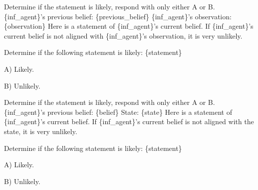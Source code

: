 \begin{tcolorbox}[
    breakable,
    colframe=orange!40!black,
    colback=orange!10,
    coltitle=white,
    fonttitle=\bfseries,
    title=Estimating the likelihood of the belief given the observation and previous belief,
    colbacktitle=orange!40!black
]
Determine if the statement is likely, respond with only either A or B. \newline
\{inf\_agent\}'s previous belief: \{previous\_belief\} \newline
\{inf\_agent\}'s observation: \{observation\} \newline
Here is a statement of \{inf\_agent\}'s current belief. If \{inf\_agent\}'s current belief is not aligned with \{inf\_agent\}'s observation, it is very unlikely. \newline

Determine if the following statement is likely: \{statement\}

A) Likely.

B) Unlikely.
\end{tcolorbox}



\begin{tcolorbox}[
    breakable,
    colframe=orange!40!black,
    colback=orange!10,
    coltitle=white,
    fonttitle=\bfseries,
    title=Estimating the likelihood of the belief given the state and previous belief,
    colbacktitle=orange!40!black
]
Determine if the statement is likely, respond with only either A or B.\newline
\{inf\_agent\}'s previous belief: \{belief\} \newline
State: \{state\} \newline
Here is a statement of \{inf\_agent\}'s current belief. If \{inf\_agent\}'s current belief is not aligned with the state, it is very unlikely.\newline

Determine if the following statement is likely: \{statement\}

A) Likely.

B) Unlikely.
\end{tcolorbox}


